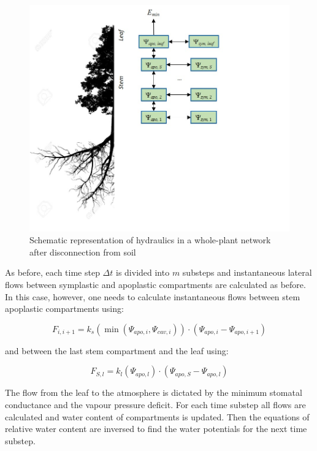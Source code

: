 \documentclass[]{book}
\begin{document}
\begin{figure}

{\centering \includegraphics[width=0.8\linewidth]{hydraulics_disc} 

}

\caption{Schematic representation of hydraulics in a whole-plant network after disconnection from soil}\label{fig:unnamed-chunk-67}
\end{figure}

As before, each time step \(\Delta t\) is divided into \(m\) substeps
and instantaneous lateral flows between symplastic and apoplastic
compartments are calculated as before. In this case, however, one needs
to calculate instantaneous flows between stem apoplastic compartments
using:

\begin{equation}
F_{i, i+1} = k_{s}(\min(\Psi_{apo,i}, \Psi_{cav, i})) \cdot (\Psi_{apo, i} - \Psi_{apo, i+1})
\end{equation}

and between the last stem compartment and the leaf using:

\begin{equation}
F_{S, l} = k_{l}(\Psi_{apo, l}) \cdot (\Psi_{apo, S} - \Psi_{apo, l})
\end{equation}

The flow from the leaf to the atmosphere is dictated by the minimum
stomatal conductance and the vapour pressure deficit. For each time
substep all flows are calculated and water content of compartments is
updated. Then the equations of relative water content are inversed to
find the water potentials for the next time substep.
\end{document}
